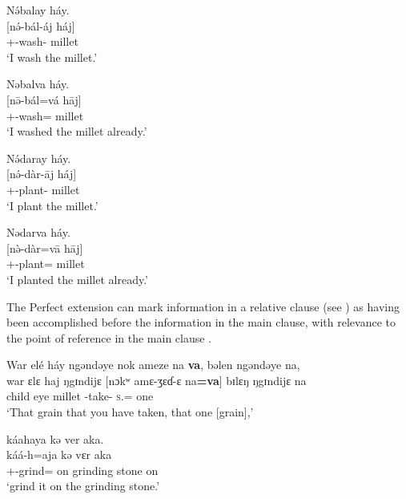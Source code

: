 \ea\label{ex:7:134}
N\'əbalay  háy.\\
\gll  {}[n\'ə-bál-áj   háj]\\
      {\oneS}+{\IFV}-wash-{\CL}  millet\\
\glt  ‘I wash the millet.’\\
\z 

\ea\label{ex:7:135}
Nəbalva  háy.\\
\gll  {}[n\=ə-bál=vá     h\={a}j]\\
      {\oneS}+{\PFV}-wash={\PRF}  millet\\
\glt  ‘I washed the millet already.’\\
\z 

\ea\label{ex:7:136}
 N\'ədaray  háy.\\
\gll  {}[n\'ə-dàr-\={a}j     háj]\\
      {\oneS}+{\IFV}-plant-{\CL}  millet\\
\glt  ‘I plant the millet.’\\
\z 

\ea\label{ex:7:137}
Nədarva  háy.\\
\gll  {}[n\`ə-dàr=v\={a}     h\={a}j]\\
      {\oneS}+{\PFV}-plant={\PRF}  millet\\
\glt  ‘I planted the millet already.’\\
\z 

The Perfect extension can mark information in a relative clause (see ) as having been accomplished before the information in the main clause, with relevance to the point of reference in the main clause . 

\ea\label{ex:7:138}
War  elé  háy  ngəndəye  nok ameze  na  \textbf{va},  bəlen  ngəndəye  na,\\ 
\gll  war     ɛlɛ  haj      ŋgɪndijɛ   [nɔkʷ  amɛ-ʒɛɗ{}-ɛ na\textbf{=va}]  bɪlɛŋ  ŋgɪndijɛ na\\ 
      child  eye  millet {\DEM}  {\twoS}  {\DEP}-take-{\CL}   \textsc{s}.{\DO}={\PRF} one {\DEM} {\PSP}\\ 
\glt ‘That grain that you have taken, that one [grain],’
      
\medskip
 káahaya  kə  ver  aka.\\
\gll káá-h=aja kə vɛr aka\\
     {\twoS}+{\POT}-grind={\PLU}  on  {grinding stone}     on\\
\glt  ‘grind it on the grinding stone.’\\
\z 


